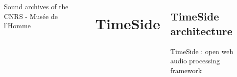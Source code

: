 \documentclass[final, hyperref, table]{beamer}
\begin{document}
\begin{frame}[containsverbatim]{}
\begin{columns}[T]
\begin{column}[T]{.49\linewidth}
\begin{block}{Sound archives of the CNRS - Musée de l'Homme}
\begin{beamerboxesrounded}
          \end{beamerboxesrounded}

            \begin{center}
            \end{center}


      \end{block}
      
      
    \end{column}
\section{TimeSide}
\begin{column}[T]{.49\linewidth}
\subsection{TimeSide architecture}
  \begin{block}{TimeSide : open web audio processing framework}


\end{block}
\end{column}
\end{columns}
\end{frame}
\end{document}

